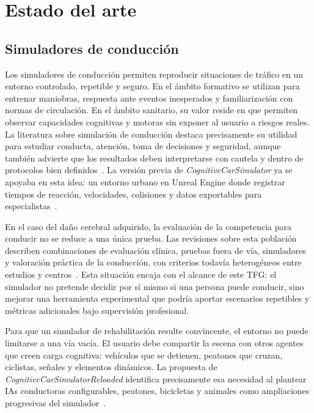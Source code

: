 \chapter{Estado del arte}

\section{Simuladores de conducción}

Los simuladores de conducción permiten reproducir situaciones de tráfico en un entorno controlado, repetible y seguro. En el ámbito formativo se utilizan para entrenar maniobras, respuesta ante eventos inesperados y familiarización con normas de circulación. En el ámbito sanitario, su valor reside en que permiten observar capacidades cognitivas y motoras sin exponer al usuario a riesgos reales. La literatura sobre simulación de conducción destaca precisamente su utilidad para estudiar conducta, atención, toma de decisiones y seguridad, aunque también advierte que los resultados deben interpretarse con cautela y dentro de protocolos bien definidos~\cite{caffo2020}. La versión previa de \textit{CognitiveCarSimulator} ya se apoyaba en esta idea: un entorno urbano en Unreal Engine donde registrar tiempos de reacción, velocidades, colisiones y datos exportables para especialistas~\cite{cognitivecar2025}.

En el caso del daño cerebral adquirido, la evaluación de la competencia para conducir no se reduce a una única prueba. Las revisiones sobre esta población describen combinaciones de evaluación clínica, pruebas fuera de vía, simuladores y valoración práctica de la conducción, con criterios todavía heterogéneos entre estudios y centros~\cite{alhashmi2023}. Esta situación encaja con el alcance de este TFG: el simulador no pretende decidir por sí mismo si una persona puede conducir, sino mejorar una herramienta experimental que podría aportar escenarios repetibles y métricas adicionales bajo supervisión profesional.

Para que un simulador de rehabilitación resulte convincente, el entorno no puede limitarse a una vía vacía. El usuario debe compartir la escena con otros agentes que creen carga cognitiva: vehículos que se detienen, peatones que cruzan, ciclistas, señales y elementos dinámicos. La propuesta de \textit{CognitiveCarSimulatorReloaded} identifica precisamente esa necesidad al plantear IAs conductoras configurables, peatones, bicicletas y animales como ampliaciones progresivas del simulador~\cite{propuesta}.

